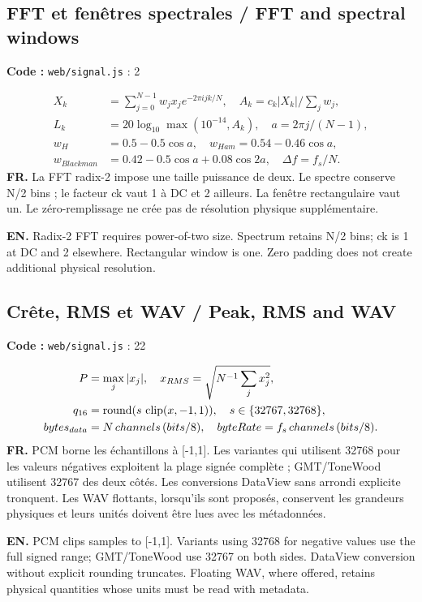 \documentclass[10pt,a4paper]{article}
\newcommand{\FR}[1]{\textbf{FR.} #1\par}\newcommand{\EN}[1]{{\selectlanguage{english}\textbf{EN.} #1\par}}
\newcommand{\loc}[1]{{\small\color{ink}\textbf{Code :} #1\par}}
\begin{document}
\begin{samepage}\subsection{FFT et fenêtres spectrales / FFT and spectral windows}
\loc{\texttt{web/signal.js} : 2}
\begin{align}X_k&=\sum_{j=0}^{N-1}w_jx_je^{-2\pi i jk/N},\quad A_k=c_k|X_k|/\sum_jw_j,\\
L_k&=20\log_{10}\max(10^{-14},A_k),\quad a=2\pi j/(N-1),\\
w_H&=0.5-0.5\cos a,\quad w_{Ham}=0.54-0.46\cos a,\\
w_{Blackman}&=0.42-0.5\cos a+0.08\cos2a,\quad \Delta f=f_s/N.\end{align}
\FR{La FFT radix-2 impose une taille puissance de deux. Le spectre conserve N/2 bins ; le facteur ck vaut 1 à DC et 2 ailleurs. La fenêtre rectangulaire vaut un. Le zéro-remplissage ne crée pas de résolution physique supplémentaire.}
\EN{Radix-2 FFT requires power-of-two size. Spectrum retains N/2 bins; ck is 1 at DC and 2 elsewhere. Rectangular window is one. Zero padding does not create additional physical resolution.}
\end{samepage}
\begin{samepage}\subsection{Crête, RMS et WAV / Peak, RMS and WAV}
\loc{\texttt{web/signal.js} : 22}
\begin{align}P&=\max_j|x_j|,\quad x_{RMS}=\sqrt{N^{-1}\sum_jx_j^2},\\
q_{16}&=\operatorname{round}(s\,\operatorname{clip}(x,-1,1)),\quad s\in\{32767,32768\},\\
bytes_{data}&=N\,channels\,(bits/8),\quad byteRate=f_s\,channels\,(bits/8).\end{align}
\FR{PCM borne les échantillons à [-1,1]. Les variantes qui utilisent 32768 pour les valeurs négatives exploitent la plage signée complète ; GMT/ToneWood utilisent 32767 des deux côtés. Les conversions DataView sans arrondi explicite tronquent. Les WAV flottants, lorsqu’ils sont proposés, conservent les grandeurs physiques et leurs unités doivent être lues avec les métadonnées.}
\EN{PCM clips samples to [-1,1]. Variants using 32768 for negative values use the full signed range; GMT/ToneWood use 32767 on both sides. DataView conversion without explicit rounding truncates. Floating WAV, where offered, retains physical quantities whose units must be read with metadata.}
\end{samepage}
\end{document}
